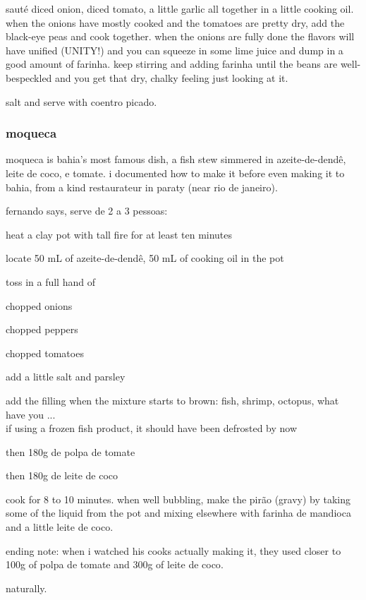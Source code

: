 saut\'{e} diced onion, diced tomato, a little garlic all together in a
little cooking oil. when the onions have mostly cooked and the
tomatoes are pretty dry, add the black-eye peas and cook
together. when the onions are fully done the flavors will have unified
(UNITY!) and you can squeeze in some lime juice and dump in a good
amount of farinha. keep stirring and adding farinha until the beans
are well-bespeckled and you get that dry, chalky feeling just looking
at it.

salt and serve with coentro picado.

\subsubsection{moqueca}

moqueca is bahia's most famous dish, a fish stew simmered in
azeite-de-dend\^{e}, \gls{leite de coco}, e tomate. i documented how to make
it before even making it to bahia, from a kind restaurateur in paraty
(near rio de janeiro).

fernando says, serve de 2 a 3 pessoas:

\begin{algorithm}
  \item heat a clay pot with tall fire for at least ten minutes

  \item locate 50 mL of azeite-de-dend\^{e}, 50 mL of cooking oil in
  the pot

  \item toss in a full hand of

  \begin{ingredients}
    \item chopped onions
    \item chopped peppers
    \item chopped tomatoes
  \end{ingredients}

  \item add a little salt and parsley

  \item add the filling when the mixture starts to brown: fish,
  shrimp, octopus, what have you ... \\if using a frozen fish product,
  it should have been defrosted by now

  \item then 180g de \gls{polpa de tomate}

  \item then 180g de \gls{leite de coco}
\end{algorithm}

cook for 8 to 10 minutes. when well bubbling, make the pir\~{a}o
(gravy) by taking some of the liquid from the pot and mixing elsewhere
with farinha de mandioca and a little \gls{leite de coco}.

ending note: when i watched his cooks actually making it, they used
closer to 100g of polpa de tomate and 300g of \gls{leite de coco}.

\bigskip

naturally.
